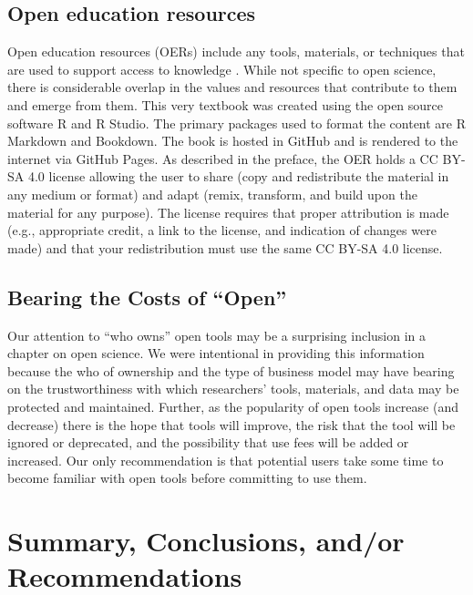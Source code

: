 \documentclass[
  11pt,
]{book}
\begin{document}
\subsection{Open education resources}\label{open-education-resources}

Open education resources (OERs) include any tools, materials, or techniques that are used to support access to knowledge \citep{bezjak_open_2018}. While not specific to open science, there is considerable overlap in the values and resources that contribute to them and emerge from them. This very textbook was created using the open source software R and R Studio. The primary packages used to format the content are R Markdown and Bookdown. The book is hosted in GitHub and is rendered to the internet via GitHub Pages. As described in the preface, the OER holds a CC BY-SA 4.0 license allowing the user to share (copy and redistribute the material in any medium or format) and adapt (remix, transform, and build upon the material for any purpose). The license requires that proper attribution is made (e.g., appropriate credit, a link to the license, and indication of changes were made) and that your redistribution must use the same CC BY-SA 4.0 license.

\subsection{Bearing the Costs of ``Open''}\label{bearing-the-costs-of-open}

Our attention to ``who owns'' open tools may be a surprising inclusion in a chapter on open science. We were intentional in providing this information because the who of ownership and the type of business model may have bearing on the trustworthiness with which researchers' tools, materials, and data may be protected and maintained. Further, as the popularity of open tools increase (and decrease) there is the hope that tools will improve, the risk that the tool will be ignored or deprecated, and the possibility that use fees will be added or increased. Our only recommendation is that potential users take some time to become familiar with open tools before committing to use them.

\section{Summary, Conclusions, and/or Recommendations}\label{summary-conclusions-andor-recommendations-2}
\end{document}
